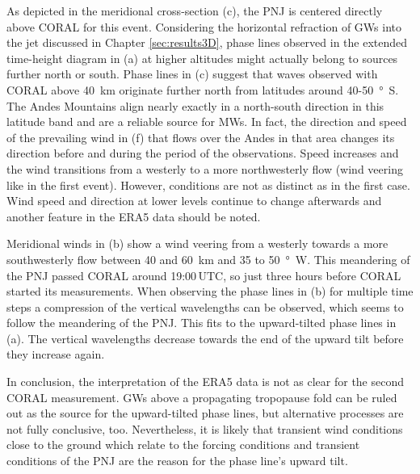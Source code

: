 As depicted in the meridional cross-section (c), the PNJ is centered directly above CORAL for this event. Considering the horizontal refraction of GWs into the jet discussed in Chapter \ref{sec:results3D}, phase lines observed in the extended time-height diagram in (a) at higher altitudes might actually belong to sources further north or south. Phase lines in (c) suggest that waves observed with CORAL above \SI{40}{\kilo\meter} originate further north from latitudes around 40-\SI{50}{\degree S}. The Andes Mountains align nearly exactly in a north-south direction in this latitude band and are a reliable source for MWs. In fact, the direction and speed of the prevailing wind in (f) that flows over the Andes in that area changes its direction before and during the period of the observations. Speed increases and the wind transitions from a westerly to a more northwesterly flow (wind veering like in the first event). However, conditions are not as distinct as in the first case. Wind speed and direction at lower levels continue to change afterwards and another feature in the ERA5 data should be noted.

Meridional winds in (b) show a wind veering from a westerly towards a more southwesterly flow between 40 and \SI{60}{\kilo\meter} and 35 to \SI{50}{\degree W}. This meandering of the PNJ passed CORAL around 19:00$ \, \textrm{UTC}$, so just three hours before CORAL started its measurements. When observing the phase lines in (b) for multiple time steps a compression of the vertical wavelengths can be observed, which seems to follow the meandering of the PNJ. This fits to the upward-tilted phase lines in (a). The vertical wavelengths decrease towards the end of the upward tilt before they increase again.

In conclusion, the interpretation of the ERA5 data is not as clear for the second CORAL measurement. GWs above a propagating tropopause fold can be ruled out as the source for the upward-tilted phase lines, but alternative processes are not fully conclusive, too. Nevertheless, it is likely that transient wind conditions close to the ground which relate to the forcing conditions and transient conditions of the PNJ are the reason for the phase line's upward tilt.

